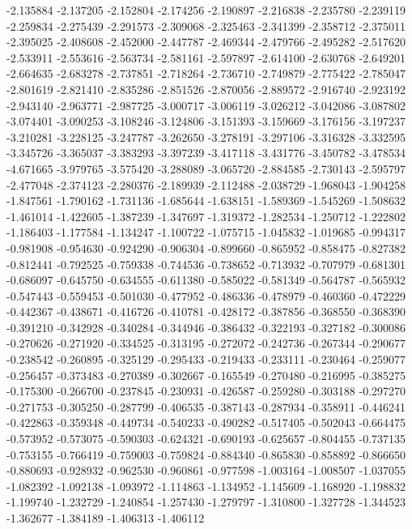 -2.135884
-2.137205
-2.152804
-2.174256
-2.190897
-2.216838
-2.235780
-2.239119
-2.259834
-2.275439
-2.291573
-2.309068
-2.325463
-2.341399
-2.358712
-2.375011
-2.395025
-2.408608
-2.452000
-2.447787
-2.469344
-2.479766
-2.495282
-2.517620
-2.533911
-2.553616
-2.563734
-2.581161
-2.597897
-2.614100
-2.630768
-2.649201
-2.664635
-2.683278
-2.737851
-2.718264
-2.736710
-2.749879
-2.775422
-2.785047
-2.801619
-2.821410
-2.835286
-2.851526
-2.870056
-2.889572
-2.916740
-2.923192
-2.943140
-2.963771
-2.987725
-3.000717
-3.006119
-3.026212
-3.042086
-3.087802
-3.074401
-3.090253
-3.108246
-3.124806
-3.151393
-3.159669
-3.176156
-3.197237
-3.210281
-3.228125
-3.247787
-3.262650
-3.278191
-3.297106
-3.316328
-3.332595
-3.345726
-3.365037
-3.383293
-3.397239
-3.417118
-3.431776
-3.450782
-3.478534
-4.671665
-3.979765
-3.575420
-3.288089
-3.065720
-2.884585
-2.730143
-2.595797
-2.477048
-2.374123
-2.280376
-2.189939
-2.112488
-2.038729
-1.968043
-1.904258
-1.847561
-1.790162
-1.731136
-1.685644
-1.638151
-1.589369
-1.545269
-1.508632
-1.461014
-1.422605
-1.387239
-1.347697
-1.319372
-1.282534
-1.250712
-1.222802
-1.186403
-1.177584
-1.134247
-1.100722
-1.075715
-1.045832
-1.019685
-0.994317
-0.981908
-0.954630
-0.924290
-0.906304
-0.899660
-0.865952
-0.858475
-0.827382
-0.812441
-0.792525
-0.759338
-0.744536
-0.738652
-0.713932
-0.707979
-0.681301
-0.686097
-0.645750
-0.634555
-0.611380
-0.585022
-0.581349
-0.564787
-0.565932
-0.547443
-0.559453
-0.501030
-0.477952
-0.486336
-0.478979
-0.460360
-0.472229
-0.442367
-0.438671
-0.416726
-0.410781
-0.428172
-0.387856
-0.368550
-0.368390
-0.391210
-0.342928
-0.340284
-0.344946
-0.386432
-0.322193
-0.327182
-0.300086
-0.270626
-0.271920
-0.334525
-0.313195
-0.272072
-0.242736
-0.267344
-0.290677
-0.238542
-0.260895
-0.325129
-0.295433
-0.219433
-0.233111
-0.230464
-0.259077
-0.256457
-0.373483
-0.270389
-0.302667
-0.165549
-0.270480
-0.216995
-0.385275
-0.175300
-0.266700
-0.237845
-0.230931
-0.426587
-0.259280
-0.303188
-0.297270
-0.271753
-0.305250
-0.287799
-0.406535
-0.387143
-0.287934
-0.358911
-0.446241
-0.422863
-0.359348
-0.449734
-0.540233
-0.490282
-0.517405
-0.502043
-0.664475
-0.573952
-0.573075
-0.590303
-0.624321
-0.690193
-0.625657
-0.804455
-0.737135
-0.753155
-0.766419
-0.759003
-0.759824
-0.884340
-0.865830
-0.858892
-0.866650
-0.880693
-0.928932
-0.962530
-0.960861
-0.977598
-1.003164
-1.008507
-1.037055
-1.082392
-1.092138
-1.093972
-1.114863
-1.134952
-1.145609
-1.168920
-1.198832
-1.199740
-1.232729
-1.240854
-1.257430
-1.279797
-1.310800
-1.327728
-1.344523
-1.362677
-1.384189
-1.406313
-1.406112
